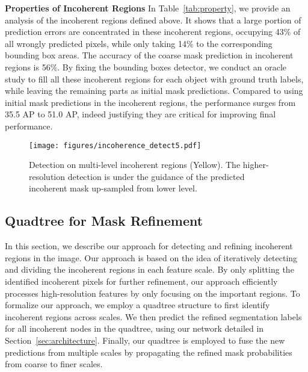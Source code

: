 \documentclass[10pt,twocolumn,letterpaper]{article}
\newcommand{\parsection}[1]{\vspace{1mm}\noindent\textbf{#1}}
\begin{document}
\parsection{Properties of Incoherent Regions}
In Table~\ref{tab:property}, we provide an analysis of the incoherent regions defined above. It shows that a large portion of prediction errors are concentrated in these incoherent regions, occupying 43$\%$ of all wrongly predicted pixels, while only taking 14$\%$ to the corresponding bounding box areas. The accuracy of the coarse mask prediction in incoherent regions is 56$\%$. By fixing the bounding boxes detector, we conduct an oracle study to fill all these incoherent regions for each object with ground truth labels, while leaving the remaining parts as initial mask predictions. Compared to using initial mask predictions in the incoherent regions, the performance surges from 35.5 AP to 51.0 AP, indeed justifying they are critical for improving final performance.


\begin{figure}[!t]
	\centering
\texttt{[image: figures/incoherence\_detect5.pdf]}
	\caption{Detection on multi-level incoherent regions (Yellow). The higher-resolution detection is under the guidance of the predicted incoherent mask up-sampled from lower level.}
\label{fig:incoherent_detect}
	\vspace{-0.2in}
\end{figure}

\subsection{Quadtree for Mask Refinement}
\label{quadtree_refinement}


In this section, we describe our approach for detecting and refining incoherent regions in the image.
Our approach is based on the idea of iteratively detecting and dividing the incoherent regions in each feature scale. By only splitting the identified incoherent pixels for further refinement, our approach efficiently processes high-resolution features by only focusing on the important regions. To formalize our approach, we employ a quadtree structure to first identify incoherent regions across scales. We then predict the refined segmentation labels for all incoherent nodes in the quadtree, using our network detailed in Section~\ref{sec:architecture}. Finally, our quadtree is employed to fuse the new predictions from multiple scales by propagating the refined mask probabilities from coarse to finer scales. 
\end{document}

